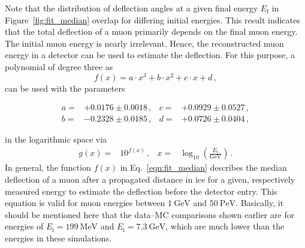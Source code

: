 Note that the distribution of deflection angles at a given final energy $E_{\mathrm{f}}$ in Figure~\ref{fig:fit_median} overlap for differing initial energies. This result indicates that the total deflection of a muon 
primarily depends on the final muon energy.
The initial muon energy is nearly irrelevant. 
Hence, the reconstructed muon 
energy in a detector can be used to estimate the deflection. For this 
purpose, a polynomial of degree three as 
\begin{equation}
     f(x) = a \cdot x^3 + b \cdot x^2 + c \cdot x + d \,,
    \label{eqn:fit_median}
\end{equation} 
can be used with the parameters 

\begin{align*}
        a =& +0.0176\pm 0.0018\,,  & c =& +0.0929\pm 0.0527\,,\\
        b =& -0.2328\pm 0.0185\,,  & d =& +0.0726\pm 0.0404\,,
\end{align*}

in the logarithmic space via 
\begin{align}
    g(x) =& 10^{f(x)}\,, & x =& \log_{10}\left(\frac{E_{\text{f}}}{\si{\giga\electronvolt}}\right)\,.
\end{align}
In general, the function $f(x)$ in Eq.~\eqref{eqn:fit_median} describes the median 
deflection of a muon after a propagated distance in ice for a given, respectively measured energy 
to estimate the deflection before the detector entry. 
This equation is valid for muon energies between 
$\SI{1}{\giga\electronvolt}$ and $\SI{50}{\peta\electronvolt}$. 
Basically, it should be mentioned here that the data--MC comparisons shown 
earlier are for energies of $E_{\mathrm{i}} = \SI{199}{\mega\electronvolt}$ and 
$E_{\mathrm{i}} = \SI{7.3}{\giga\electronvolt}$, which are much lower than the 
energies in these simulations.

